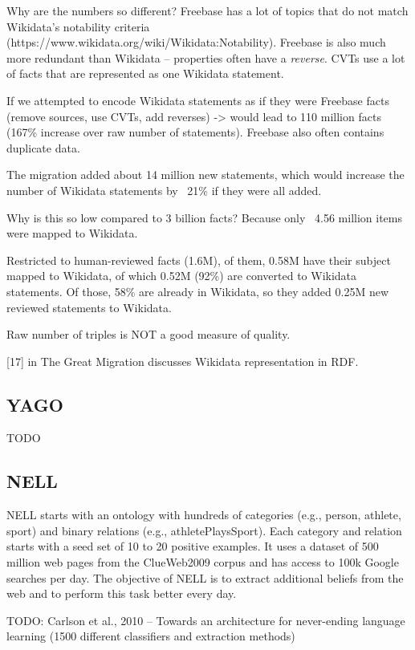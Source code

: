 Why are the numbers so different? Freebase has a lot of topics that do not match
Wikidata's notability criteria (https://www.wikidata.org/wiki/Wikidata:Notability).
Freebase is also much more redundant than Wikidata -- properties often have a
\textit{reverse}.
CVTs use a lot of facts that are represented as one Wikidata statement.

If we attempted to encode Wikidata statements as if they were Freebase facts
(remove sources, use CVTs, add reverses) -> would lead to 110 million facts
(167\% increase over raw number of statements).
Freebase also often contains duplicate data.

The migration added about 14 million new statements, which would increase the
number of Wikidata statements by ~21\% if they were all added.

Why is this so low compared to 3 billion facts? Because only ~4.56 million items
were mapped to Wikidata.

Restricted to human-reviewed facts (1.6M), of them, 0.58M have their subject
mapped to Wikidata, of which 0.52M (92\%) are converted to Wikidata statements.
Of those, 58\% are already in Wikidata, so they added 0.25M new reviewed
statements to Wikidata.

Raw number of triples is NOT a good measure of quality.

[17] in The Great Migration discusses Wikidata representation in RDF.

\subsection{YAGO}

TODO

\subsection{NELL}

NELL starts with an ontology with hundreds of categories (e.g., person, athlete,
sport) and binary relations (e.g., athletePlaysSport). Each category and
relation starts with a seed set of 10 to 20 positive examples.
It uses a dataset of 500 million web pages from the ClueWeb2009 corpus and
has access to 100k Google searches per day.
The objective of NELL is to extract additional beliefs from the web and to
perform this task better every day.

TODO: Carlson et al., 2010 -- Towards an architecture for never-ending language
learning (1500 different classifiers and extraction methods)

